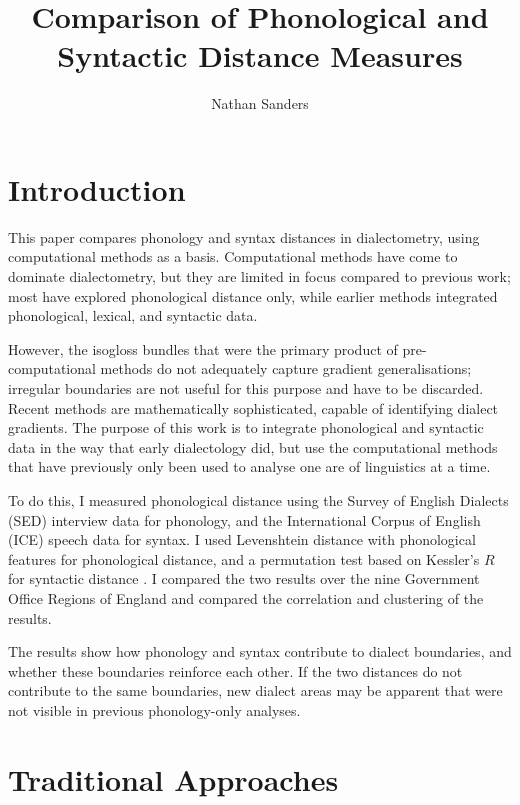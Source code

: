 \documentclass[11pt]{article}
\title{Comparison of Phonological and Syntactic Distance Measures}
\author{Nathan Sanders}
\begin{document}
\maketitle
\doublespacing
\section{Introduction}
This paper compares phonology and syntax distances in dialectometry,
using computational methods as a basis. Computational methods have
come to dominate dialectometry, but they are limited in focus compared
to previous work; most have explored phonological distance only, while
earlier methods integrated phonological, lexical, and syntactic data.

However, the isogloss bundles that were the primary product of
pre-computational methods do not adequately capture gradient
generalisations; irregular boundaries are not useful for this purpose
and have to be discarded. Recent methods are mathematically
sophisticated, capable of identifying dialect gradients. The purpose
of this work is to integrate phonological and syntactic data in the
way that early dialectology did, but use the computational methods
that have previously only been used to analyse one are of linguistics
at a time.

To do this, I measured phonological distance using the Survey of
English Dialects (SED) \cite{orton63} interview data for phonology,
and the International Corpus of English (ICE) \cite{nelson02} speech
data for syntax. I used Levenshtein distance \cite{lev65} with
phonological features \cite{nerbonne97} for phonological distance, and
a permutation test based on Kessler's $R$ \cite{kessler01} for
syntactic distance \cite{nerbonne06}. I compared the two results over
the nine Government Office Regions of England and compared the
correlation and clustering of the results.

The results show how phonology and syntax contribute to dialect
boundaries, and whether these boundaries reinforce each other. If the
two distances do not contribute to the same boundaries, new dialect
areas may be apparent that were not visible in previous phonology-only
analyses.

\section{Traditional Approaches}
\end{document}

